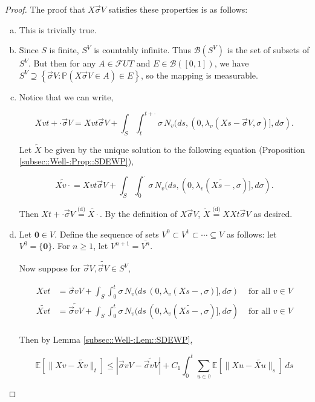 \documentclass[12pt]{article}
\newcommand{\mb}{\mathbb}
\newcommand{\mc}{\mathcal}
\newcommand{\ms}{\mathscr}
\newcommand{\ov}{\overline}
\newcommand{\te}{\text}
\newcommand{\ind}{\hspace{24pt}}
\newcommand{\pr}{\mb{P}}							%
\newcommand{\ex}[1]{\mb{E}\left[#1\right]}			%
\newcommand{\deq}{\overset{\text{(d)}}{=}}			%
\renewcommand{\root}{\mathbf{0}}				%
\renewcommand{\v}{v}							%
\newcommand{\vv}{u}								%
\renewcommand{\U}{U}							%
\renewcommand{\S}{S}							%
\newcommand{\s}{\sigma}							%
\newcommand{\sv}{\vec{\s}}						%
\newcommand{\T}{T}								%
\renewcommand{\t}{t}							%
\renewcommand{\tt}{s}							%
\newcommand{\F}{\mc{F}}							%
\newcommand{\X}{X}								%
\newcommand{\cl}{\ov}							%
\newcommand{\poiss}[1]{N_{#1}}						%
\newcommand{\pup}[1]{^{#1}}							%
\newcommand{\V}{V}									%
\newcommand{\numb}{n}								%
\newcommand{\XState}[1]{\S^{#1}}				%
\newcommand{\rate}[1]{\lambda_{#1}}					%
\newcommand{\const}[1]{C_{#1}}						%
\newcommand{\alt}{\widetilde}						%
\begin{document}
\begin{proof}
The proof that \(\X{}{}{\sv{}{\V}}\) satisfies these properties is as follows:

\begin{enumerate}[(a)]
\item This is trivially true.

\item Since \(\S\) is finite, \(\S^\V\) is countably infinite. Thus \(\ms{B}(\S^\V)\) is the set of subsets of \(\S^\V\). But then for any \(A \in \F{\U}{\T}\) and \(E \in \ms{B}([0,1])\), we have \(\S^\V \supseteq \left\{\sv{}{\V}: \pr\left(\X{}{}{\sv{}{\V}} \in A\right) \in E\right\}\), so the mapping is measurable.

\item Notice that we can write,

\[\X{\v}{\t+\cdot}{\sv{}{\V}} = \X{\v}{\t}{\sv{}{\V}} + \int_\S\int_\t^{\t+\cdot} \s\,\poiss{\v}(d\tt,(0,\rate{\v}(\X{}{\tt-}{\sv{}{\V}},\s)],d\s).\]

Let \(\alt{\X{}{}}\) be given by the unique solution to the following equation (Proposition \ref{subsec::Well-:Prop::SDEWP}),

\[\alt{\X{\v}{\cdot}} = \X{\v}{\t}{\sv{}{\V}} + \int_\S \int_0^\cdot \s\,\poiss{\v}(d\tt,(0,\rate{\v}(\alt{\X{}{\tt-}},\s)],d\s).\]

Then \(\X{}{\t+\cdot}{\sv{}{\V}} \deq \alt{\X{}{\cdot}}\). By the definition of \(\X{}{}{\sv{}{\V}}\), \(\alt{\X{}{}} \deq \X{}{}{\X{}{\t}{\sv{}{\V}}}\) as desired.

\item Let \(\root \in \V\). Define the sequence of sets \(\V\pup{0}\subset \V\pup{1}\subset \cdots \subseteq \V\) as follows: let \(\V\pup{0} = \{\root\}\). For \(\numb \geq 1\), let \(\V\pup{\numb+1} = \cl{\V\pup{\numb}}\).

\ind Now suppose for \(\sv{}{\V},\alt{\sv{}{\V}}\in \S^\V\),

\begin{align*}
\X{\v}{\t} &= \sv{\v}{\V} + \int_\S\int_0^\t \s\,\poiss{\v}(d\tt\,(0,\rate{\v}(\X{}{\tt-},\s)],d\s)&\te{ for all } \v \in \V\\
\alt{\X{\v}{\t}} &= \alt{\sv{\v}{\V}} + \int_\S\int_0^\t \s\,\poiss{\v}(d\tt\,(0,\rate{\v}(\alt{\X{}{\tt-}},\s)],d\s)&\te{ for all } \v \in \V\\
\end{align*}

Then by Lemma \ref{subsec::Well-:Lem::SDEWP},

\[\ex{\|\X{\v}{} - \alt{\X{\v}{}}\|_\t} \leq |\sv{\v}{\V} - \alt{\sv{\v}{\V}}| + \const{1}\int_0^\t \sum_{\vv\in \cl{\v}} \ex{\|\X{\vv}{} - \alt{\X{\vv}{}}\|_\tt}\,d\tt\]


\end{enumerate}
\end{proof}
\end{document}
